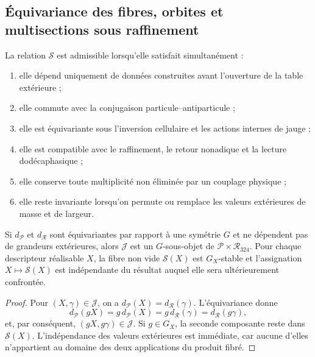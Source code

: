 \subsection{Équivariance des fibres, orbites et multisections sous raffinement}

\begin{definition}
La relation \(\mathscr S\) est admissible lorsqu'elle satisfait simultanément :
\begin{enumerate}
\item elle dépend uniquement de données construites avant l'ouverture de la table extérieure ;
\item elle commute avec la conjugaison particule--antiparticule ;
\item elle est équivariante sous l'inversion cellulaire et les actions internes de
      jauge ;
\item elle est compatible avec le raffinement, le retour nonadique et la lecture
      dodécaphasique ;
\item elle conserve toute multiplicité non éliminée par un couplage physique ;
\item elle reste invariante lorsqu'on permute ou remplace les valeurs extérieures de
      masse et de largeur.
\end{enumerate}
\end{definition}

\begin{theorem}
Si \(d_{\mathcal P}\) et \(d_{\mathcal R}\) sont équivariantes par rapport à une
symétrie \(G\) et ne dépendent pas de grandeurs extérieures, alors \(\mathcal J\)
est un \(G\)-sous-objet de \(\mathcal P\times\mathcal R_{324}\). Pour chaque
descripteur réalisable \(X\), la fibre non vide \(\mathscr S(X)\) est
\(G_X\)-stable et l'assignation \(X\mapsto\mathscr S(X)\) est indépendante du
résultat auquel elle sera ultérieurement confrontée.
\end{theorem}

\begin{proof}
Pour \((X,\gamma)\in\mathcal J\), on a
\(d_{\mathcal P}(X)=d_{\mathcal R}(\gamma)\). L'équivariance donne
\[
 d_{\mathcal P}(gX)=g\,d_{\mathcal P}(X)
 =g\,d_{\mathcal R}(\gamma)=d_{\mathcal R}(g\gamma),
\]
et, par conséquent, \((gX,g\gamma)\in\mathcal J\). Si \(g\in G_X\), la
seconde composante reste dans \(\mathscr S(X)\). L'indépendance des
valeurs extérieures est immédiate, car aucune d'elles n'appartient au domaine
des deux applications du produit fibré.
\end{proof}

